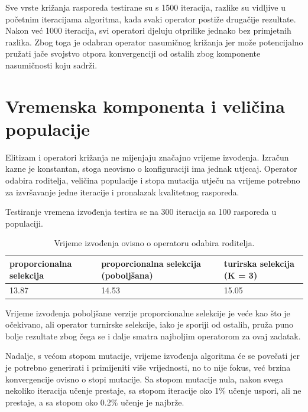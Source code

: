 \documentclass[times, utf8, zavrsni]{fer}
\begin{document}
Sve vrste križanja rasporeda testirane su s 1500 iteracija, razlike su vidljive u početnim iteracijama algoritma, kada svaki operator postiže drugačije rezultate. Nakon već 1000 iteracija, svi operatori djeluju otprilike jednako bez primjetnih razlika. Zbog toga je odabran operator nasumičnog križanja jer može potencijalno pružati jače svojstvo otpora konvergenciji od ostalih zbog komponente nasumičnosti koju sadrži.

\section{Vremenska komponenta i veličina populacije}

Elitizam i operatori križanja ne mijenjaju značajno vrijeme izvođenja. Izračun kazne je konstantan, stoga neovisno o konfiguraciji ima jednak utjecaj. Operator odabira roditelja, veličina populacije i stopa mutacija utječu na vrijeme potrebno za izvršavanje jedne iteracije i pronalazak kvalitetnog rasporeda.

Testiranje vremena izvođenja  testira se na 300 iteracija sa 100 rasporeda u populaciji.

\begin{table}[htb]
\caption{Vrijeme izvođenja ovisno o operatoru odabira roditelja.}
\label{tbl:iter-roditelj}
\centering
\begin{tabular}{lll} \hline
proporcionalna selekcija & proporcionalna selekcija (poboljšana) &  turirska selekcija (K = 3)\\ \hline
13.87 & 14.53 & 15.05\\ \hline
\end{tabular}
\end{table}

Vrijeme izvođenja poboljšane verzije proporcionalne selekcije je veće kao što je očekivano, ali operator turnirske selekcije, iako je sporiji od ostalih, pruža puno bolje rezultate zbog čega se i dalje smatra najboljim operatorom za ovaj zadatak.

Nadalje, s većom stopom mutacije, vrijeme izvođenja algoritma će se povečati jer je potrebno generirati i primijeniti više vrijednosti, no to nije fokus, već brzina konvergencije ovisno o stopi mutacije. Sa stopom mutacije nula, nakon svega nekoliko iteracija učenje prestaje, sa stopom iteracije oko 1\% učenje uspori, ali ne prestaje, a sa stopom oko 0.2\% učenje je najbrže.

\newpage
\end{document}
